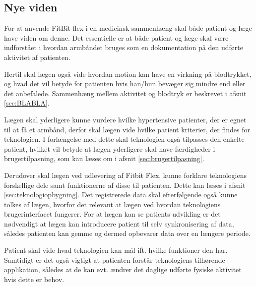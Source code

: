 \subsection{Nye viden}

For at anvende FitBit flex i en medicinsk sammenhæng skal både patient og læge have viden om denne. Det essentielle er at både patient og læge skal være indforstået i hvordan armbåndet bruges som en dokumentation på den udførte aktivitet af patienten. 


Hertil skal lægen også vide hvordan motion kan have en virkning på blodtrykket, og hvad det vil betyde for patienten hvis han/hun bevæger sig mindre end eller det anbefalede. Sammenhæng mellem aktivitet og blodtryk er beskrevet i afsnit \ref{sec:BLABLA}.


Lægen skal yderligere kunne vurdere hvilke hypertensive patienter, der er egnet til at få et armbånd, derfor skal lægen vide hvilke patient kriterier, der findes for teknologien. I forlængelse med dette skal teknologien også tilpasses den enkelte patient, hvilket vil betyde at lægen yderligere skal have færdigheder i brugertilpasning, som kan læses om i afsnit \ref{sec:brugertilpasning}. 


Derudover skal lægen ved udlevering af Fitbit Flex, kunne forklare teknologiens forskellige dele samt funktionerne af disse til patienten. Dette kan læses i afsnit \ref{sec:teknologiopbygning}. Det registrerede data skal efterfølgende også kunne tolkes af lægen, hvorfor det relevant at lægen ved hvordan teknologiens brugerinterfacet fungerer. For at lægen kan se patients udvikling er det nødvendigt at lægen kan introducere patient til selv synkronisering af data, således patienten kan gemme og dermed opbevarer data over en længere periode. 


Patient skal vide hvad teknologien kan mål ift. hvilke funktioner den har. Samtidigt er det også vigtigt at patienten forstår teknologiens tilhørende applikation, således at de kan evt. ændrer det daglige udførte fysiske aktivitet hvis dette er behov. 